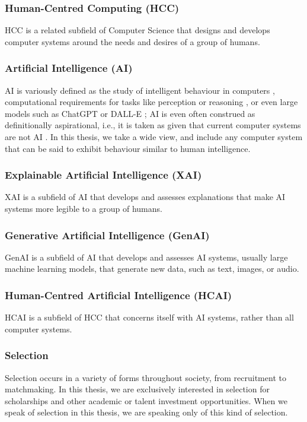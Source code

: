 \subsubsection{Human-Centred Computing (HCC)}
HCC is a related subfield of Computer Science that designs and develops computer systems around the needs and desires of a group of humans.

\subsubsection{Artificial Intelligence (AI)}
AI is variously defined as the study of intelligent behaviour in computers \cite{wang2008you}, computational requirements for tasks like perception or reasoning \cite{Leake2001ArtiicialI}, or even large models such as ChatGPT or DALL-E \cite{du2020ai}; AI is even often construed as definitionally aspirational, i.e., it is taken as given that current computer systems are not AI \cite{wang2008you}. In this thesis, we take a wide view, and include any computer system that can be said to exhibit behaviour similar to human intelligence.

\subsubsection{Explainable Artificial Intelligence (XAI)}
XAI is a subfield of AI that develops and assesses explanations that make AI systems more legible to a group of humans.

\subsubsection{Generative Artificial Intelligence (GenAI)}
GenAI is a subfield of AI that develops and assesses AI systems, usually large machine learning models, that generate new data, such as text, images, or audio.

\subsubsection{Human-Centred Artificial Intelligence (HCAI)}
HCAI is a subfield of HCC that concerns itself with AI systems, rather than all computer systems.

\subsubsection{Selection}
Selection occurs in a variety of forms throughout society, from recruitment to matchmaking. In this thesis, we are exclusively interested in selection for scholarships and other academic or talent investment opportunities. When we speak of selection in this thesis, we are speaking only of this kind of selection.

